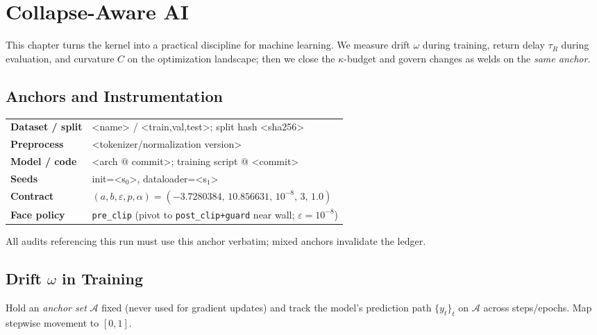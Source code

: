 \chapter{Collapse-Aware AI}
\label{ch:ai}

This chapter turns the kernel into a practical discipline for machine learning. We measure drift \(\omega\) during training, return delay \(\tau_{R}\) during evaluation, and curvature \(C\) on the optimization landscape; then we close the \(\kappa\)-budget and govern changes as welds on the \emph{same anchor}.

\section{Anchors and Instrumentation}
\label{sec:ai-anchors}

\begin{eqbox}
\small
\begin{tabularx}{\linewidth}{@{}>{\bfseries}l X@{}}
Dataset / split    & <name> / <train,val,test>; split hash <sha256> \\
Preprocess         & <tokenizer/normalization version> \\
Model / code       & <arch @ commit>; training script @ <commit> \\
Seeds              & init=<s$_0$>, dataloader=<s$_1$> \\
Contract           & $(a,b,\varepsilon,p,\alpha)=(-3.7280384,\,10.856631,\,10^{-8},\,3,\,1.0)$ \\
Face policy        & \texttt{pre\_clip} (pivot to \texttt{post\_clip+guard} near wall; $\varepsilon=10^{-8}$) \\
\end{tabularx}

\vspace{0.2\baselineskip}
\raggedright\footnotesize
All audits referencing this run must use this anchor verbatim; mixed anchors invalidate the ledger.
\end{eqbox}


\section{Drift \texorpdfstring{\(\omega\)}{omega} in Training}
\label{sec:ai-drift}
Hold an \emph{anchor set} \(\mathcal{A}\) fixed (never used for gradient updates) and track the model’s prediction path \(\{y_t\}_t\) on \(\mathcal{A}\) across steps/epochs. Map stepwise movement to \([0,1]\).

